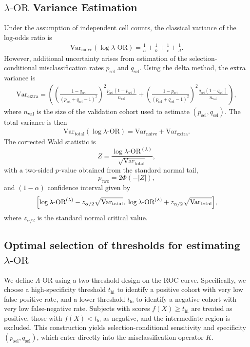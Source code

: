 \documentclass[pdflatex,sn-mathphys-num]{sn-jnl}%
\def\EQSP{3pt}
\newcommand{\mltlne}[2][\EQSP]{\begingroup\setlength\abovedisplayskip{#1}\setlength\belowdisplayskip{#1}\begin{equation}\begin{multlined} #2 \end{multlined}\end{equation}\endgroup\noindent}
\newcommand{\cgather}[2][\EQSP]{\begingroup\setlength\abovedisplayskip{#1}\setlength\belowdisplayskip{#1}\begin{gather} #2 \end{gather}\endgroup\noindent}
\newcommand{\cgathers}[2][\EQSP]{\begingroup\setlength\abovedisplayskip{#1}\setlength\belowdisplayskip{#1}\begin{gather*} #2 \end{gather*}\endgroup\noindent}
\newcommand{\SPOR}{\textrm{$\lambda$-OR}}
\newcommand{\logor}{\log\SPOR}
\theoremstyle{thmstyleone}%
\theoremstyle{thmstyletwo}%
\theoremstyle{thmstylethree}%
\begin{document}
\subsection{$\SPOR$ Variance Estimation}
Under the assumption of independent cell counts, the classical variance of the log-odds ratio is
\cgather{
\mathrm{Var}_{\text{naive}}(\logor) = \frac{1}{a} + \frac{1}{b} + \frac{1}{c} + \frac{1}{d}.
}%
However, additional uncertainty arises from estimation of the selection-conditional misclassification rates $p_{\text{sel}}$ and $q_{\text{sel}}$. Using the delta method, the extra variance is
\mltlne{
\mathrm{Var}_{\text{extra}} =
  \left( \left( \frac{1-q_{\text{sel}}}{(p_{\text{sel}} + q_{\text{sel}} - 1)^2} \right)^2
        \frac{p_{\text{sel}}(1-p_{\text{sel}})}{n_{\text{val}}} \right. 
 + \left. \left( \frac{1-p_{\text{sel}}}{(p_{\text{sel}} + q_{\text{sel}} - 1)^2} \right)^2
        \frac{q_{\text{sel}}(1-q_{\text{sel}})}{n_{\text{val}}} \right),
}%
where $n_{\text{val}}$ is the size of the validation cohort used to estimate $(p_{\text{sel}},q_{\text{sel}})$. The total variance is then
\cgather{
\mathrm{Var}_{\text{total}}(\logor) =
\mathrm{Var}_{\text{naive}} + \mathrm{Var}_{\text{extra}}.
}%
The corrected Wald statistic is
\[
Z = \frac{\logor^{(\lambda)}}{\sqrt{\mathrm{Var}_{\text{total}}}},
\]
with a two-sided $p$-value obtained from the standard normal tail,
\[
p_{\text{two}} = 2 \Phi(-|Z|),
\]
and $(1-\alpha)$ confidence interval given by
\cgathers{
\Bigl[ \logor^{(\lambda)} - z_{\alpha/2} \sqrt{\mathrm{Var}_{\text{total}}},
       \; \logor^{(\lambda)} + z_{\alpha/2} \sqrt{\mathrm{Var}_{\text{total}}} \Bigr],
}
where $z_{\alpha/2}$ is the standard normal critical value.


\subsection{Optimal selection of thresholds for estimating $\SPOR$}
We define $\Lambda$-OR using a two-threshold design on the ROC curve. 
Specifically, we choose a high-specificity threshold $t_{\mathrm{hi}}$ to identify 
a positive cohort with very low false-positive rate, and a lower threshold 
$t_{\mathrm{lo}}$ to identify a negative cohort with very low false-negative rate. 
Subjects with scores $f(X) \ge t_{\mathrm{hi}}$ are treated as positive, 
those with $f(X) < t_{\mathrm{lo}}$ as negative, and the intermediate region is excluded. 
This construction yields selection-conditional sensitivity and specificity 
$(p_{\text{sel}}, q_{\text{sel}})$, which enter directly into the 
misclassification operator $K$.
\end{document}
